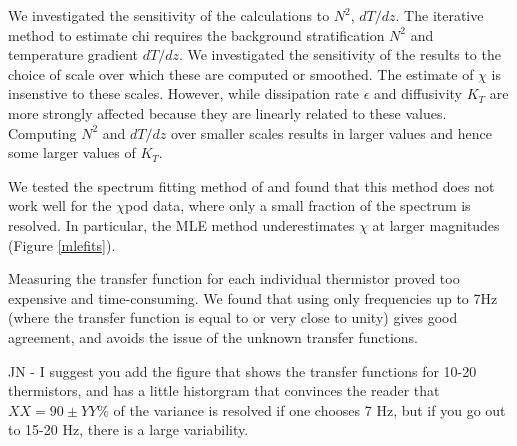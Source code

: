\documentclass{ametsoc}
\begin{document}

We investigated the sensitivity of the calculations to $N^2$, $dT/dz$. The iterative method to estimate chi requires the background stratification $N^2$ and temperature gradient $dT/dz$. We investigated the sensitivity of the results to the choice of scale over which these are computed or smoothed. The estimate of $\chi$ is insenstive to these scales. However, while dissipation rate $\epsilon$ and diffusivity $K_T$ are more strongly affected because they are linearly related to these values. Computing $N^2$ and $dT/dz$ over smaller scales results in larger values and hence some larger values of $K_T$.


\appendix[C]


We tested the spectrum fitting method of \cite{ruddicketal00} and found that this method does not work well for the $\chi$pod data, where only a small fraction of the spectrum is resolved. In particular, the MLE method underestimates $\chi$ at larger magnitudes (Figure \ref{mlefits}). 

\appendix[D]

Measuring the transfer function for each individual thermistor proved too expensive and time-consuming. We found that using only frequencies up to 7Hz (where the transfer function is equal to or very close to unity) gives good agreement, and avoids the issue of the unknown transfer functions.

JN - I suggest you add the figure that shows the transfer functions for 10-20 thermistors, and has a little historgram that convinces the reader that $XX=90 \pm YY \%$ of the variance is resolved if one chooses 7 Hz, but if you go out to 15-20 Hz, there is a large variability.    


%


\end{document}
